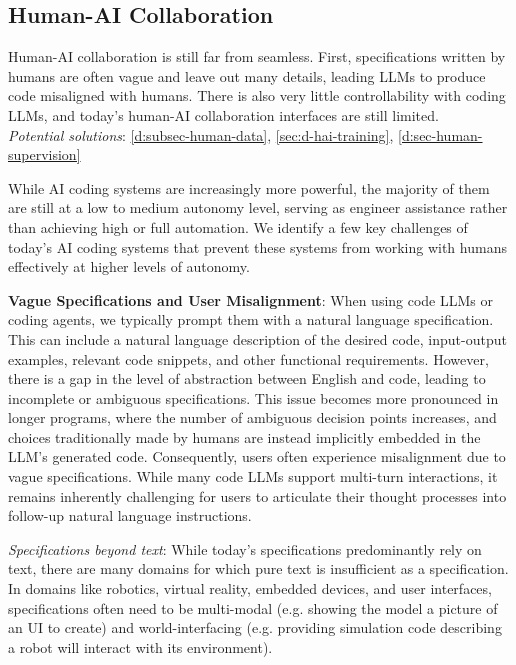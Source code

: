 \subsection{Human-AI Collaboration} \label{sec:c-hai-colab}

\begin{tcolorbox}[colback=lightgreen, boxrule=0pt, arc=5pt, outer arc=5pt, after skip=10pt plus 2pt]
Human-AI collaboration is still far from seamless. First, specifications written by humans are often vague and leave out many details, leading LLMs to produce code misaligned with humans. There is also very little controllability with coding LLMs, and today's human-AI collaboration interfaces are still limited.
\newline \\
\textit{Potential solutions}: \ref{d:subsec-human-data}, \ref{sec:d-hai-training}, \ref{d:sec-human-supervision}%
\end{tcolorbox}


While AI coding systems are increasingly more powerful, the majority of them are still at a low to medium autonomy level, serving as engineer assistance rather than achieving high or full automation. We identify a few key challenges of today's AI coding systems that prevent these systems from working with humans effectively at higher levels of autonomy.

\textbf{Vague Specifications and User Misalignment}: When using code LLMs or coding agents, we typically prompt them with a natural language specification. This can include a natural language description of the desired code, input-output examples, relevant code snippets, and other functional requirements. However, there is a gap in the level of abstraction between English and code, leading to incomplete or ambiguous specifications. This issue becomes more pronounced in longer programs, where the number of ambiguous decision points increases, and choices traditionally made by humans are instead implicitly embedded in the LLM’s generated code. Consequently, users often experience misalignment due to vague specifications. While many code LLMs support multi-turn interactions, it remains inherently challenging for users to articulate their thought processes into follow-up natural language instructions.

\textit{Specifications beyond text}: While today's specifications predominantly rely on text, there are many domains for which pure text is insufficient as a specification. In domains like robotics, virtual reality, embedded devices, and user interfaces, specifications often need to be multi-modal (e.g. showing the model a picture of an UI to create) and world-interfacing (e.g. providing simulation code describing a robot will interact with its environment).

